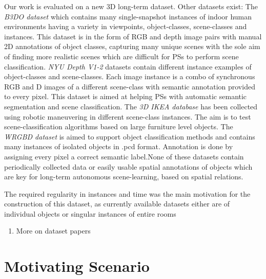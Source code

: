 \documentclass[letterpaper, 10 pt, conference]{ieeeconf}  %
\begin{document}
Our work is evaluated on a new 3D long-term dataset. Other datasets exist: The \textit{B3DO dataset} \cite{Janoch:ICCV2011} which contains many single-snapshot instances of indoor human environments having a variety in viewpoints, object-classes, scene-classes and instances. This dataset is in the form of RGB and depth image pairs with manual 2D annotations of object classes, capturing many unique scenes with the sole aim of finding more realistic scenes which are difficult for PSs to perform scene classification. \textit{NYU Depth V1-2} \cite{Silberman:ECCV2012} datasets contain different instance examples of object-classes and scene-classes. Each image instance is a combo of synchronous RGB and D images of a different scene-class with semantic annotation provided to every pixel. This dataset is aimed at helping PSs with automatic semantic segmentation and scene classification. The \textit{3D IKEA database} \cite{Swadzba:RAS2012} has been collected using robotic maneuvering in different scene-class instances. The aim is to test scene-classification algorithms based on large furniture level objects. The \textit{WRGBD dataset} \cite{Lai:ICRA2011} is aimed to support object classification methods and contains many instances of isolated objects in .pcd format. Annotation is done by assigning every pixel a correct semantic label.None of these datasets contain periodically collected data or easily usable spatial annotations of objects which are key for long-term autonomous scene-learning, based on spatial relations.

The required regularity in instances and time was the main motivation for the construction of this dataset, as currently available datasets either are of individual objects or singular instances of entire rooms



\begin{enumerate}
  \item More on dataset papers
\end{enumerate}


\section{Motivating Scenario}
\label{sec:Motivating Scenario}
\end{document}
